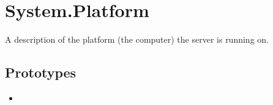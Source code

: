 
\section{System.Platform}
A description of the platform (the computer) the server is running on.

\subsection{Prototypes}
\begin{itemize}
\item {}
\end{itemize}

